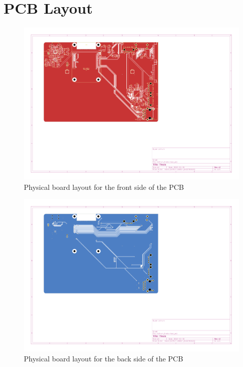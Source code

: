 \section{PCB Layout}

\begin{figure}[h]
  \centering
  \includegraphics[height=0.9\textwidth,angle=90,page=1]{Figures/kicad/lathrum_thesis_layout_front.pdf}
  \captionsetup{width=.8\linewidth}
  \caption[PCB Front Layout]{Physical board layout for the front side of the PCB}
  \label{fig:pcb_layout_front}
\end{figure}

\begin{figure}[h]
  \centering
  \includegraphics[height=0.9\textwidth,angle=90,page=1]{Figures/kicad/lathrum_thesis_layout_back.pdf}
  \captionsetup{width=.8\linewidth}
  \caption[PCB Back Layout]{Physical board layout for the back side of the PCB}
  \label{fig:pcb_layout_back}
\end{figure}